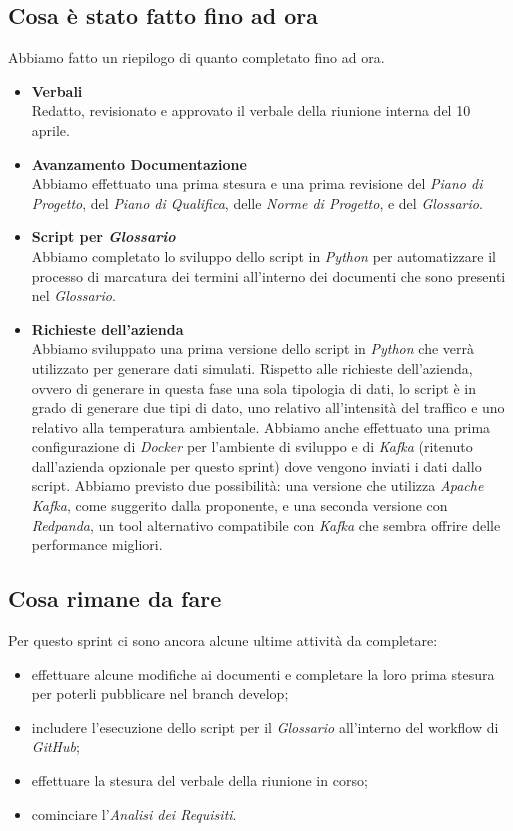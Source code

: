 \documentclass[italian,12pt]{article}
\begin{document}
\subsection{Cosa è stato fatto fino ad ora}
Abbiamo fatto un riepilogo di quanto completato fino ad ora.
\begin{itemize}
	\item \textbf{Verbali} \\
	      Redatto, revisionato e approvato il verbale della riunione interna del 10 aprile.
	\item \textbf{Avanzamento Documentazione} \\
	      Abbiamo effettuato una prima stesura e una prima revisione del \textit{Piano di Progetto}, del \textit{Piano di Qualifica}, delle \textit{Norme di Progetto}, e del \textit{Glossario}.
	\item \textbf{Script per \textit{Glossario}} \\
	      Abbiamo completato lo sviluppo dello script in \textit{Python} per automatizzare il processo di marcatura dei termini all'interno dei documenti che sono presenti nel \textit{Glossario}.
	\item \textbf{Richieste dell'azienda} \\
	      Abbiamo sviluppato una prima versione dello script in \textit{Python} che verrà utilizzato per generare dati simulati. Rispetto alle richieste dell'azienda, ovvero di generare in questa fase una sola tipologia di dati, lo script è in grado di generare due tipi di dato, uno relativo all'intensità del traffico e uno relativo alla temperatura ambientale. Abbiamo anche effettuato una prima configurazione di \textit{Docker} per l'ambiente di sviluppo e di \textit{Kafka} (ritenuto dall'azienda opzionale per questo sprint) dove vengono inviati i dati dallo script. Abbiamo previsto due possibilità: una versione che utilizza \textit{Apache Kafka}, come suggerito dalla proponente, e una seconda versione con \textit{Redpanda}, un tool alternativo compatibile con \textit{Kafka} che sembra offrire delle performance migliori.
\end{itemize}

\subsection{Cosa rimane da fare}
Per questo sprint ci sono ancora alcune ultime attività da completare:
\begin{itemize}
	\item effettuare alcune modifiche ai documenti e completare la loro prima stesura per poterli pubblicare nel branch develop;
	\item includere l'esecuzione dello script per il \textit{Glossario} all'interno del workflow di \textit{GitHub};
	\item effettuare la stesura del verbale della riunione in corso;
	\item cominciare l'\textit{Analisi dei Requisiti}.
\end{itemize}
\end{document}
